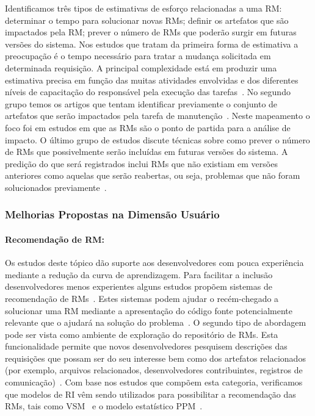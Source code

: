 Identificamos três tipos de estimativas de esforço relacionadas a uma RM\@:
determinar o tempo para solucionar novas RMs; definir os artefatos que são
impactados pela RM\@; prever o número de RMs que poderão surgir em futuras
versões do sistema. Nos estudos que tratam da primeira forma de estimativa a
preocupação é o tempo necessário para tratar a mudança solicitada em determinada
requisição. A principal complexidade está em produzir uma estimativa precisa em
função das muitas atividades envolvidas e dos diferentes níveis de capacitação
do responsável pela execução das tarefas~\cite{xia2015automatic}. No segundo
grupo temos os artigos que tentam identificar previamente o conjunto de
artefatos que serão impactados pela tarefa de manutenção~\cite{Nagwani2010}.
Neste mapeamento o foco foi em estudos em que as RMs são o ponto de partida para
a análise de impacto. O último grupo de estudos discute técnicas sobre como
prever o número de RMs que possivelmente serão incluídas em futuras versões do
sistema. A predição do que será registrados inclui RMs que não existiam em
versões anteriores como aquelas que serão reabertas, ou seja, problemas que não
foram solucionados previamente~\cite{xia2015automatic}.

\subsubsection{Melhorias Propostas na Dimensão Usuário}
\label{ssub:melhorias_dim_usuario}

\paragraph{Recomendação de RM:}

Os estudos deste tópico dão suporte aos desenvolvedores com pouca experiência
mediante a redução da curva de aprendizagem. Para facilitar a inclusão
desenvolvedores menos experientes alguns estudos propõem sistemas de
recomendação de RMs~\cite{malheiros2012source, Wang2011bug}. Estes sistemas
podem ajudar o recém-chegado a solucionar uma RM mediante a apresentação do
código fonte potencialmente relevante que o ajudará na solução do
problema~\cite{malheiros2012source}. O segundo tipo de abordagem pode ser vista
como ambiente de exploração do repositório de RMs. Esta funcionalidade permite
que novos desenvolvedores pesquisem descrições das requisições que possam ser do
seu interesse bem como dos artefatos relacionados (por exemplo, arquivos
relacionados, desenvolvedores contribuintes, registros de
comunicação)~\cite{Wang2011bug}. Com base nos estudos que compõem esta
categoria, verificamos que modelos de RI vêm sendo utilizados para possibilitar
a recomendação das RMs\@, tais como VSM~\cite{Wang2011bug} e o modelo
estatístico PPM~\cite{malheiros2012source}.

